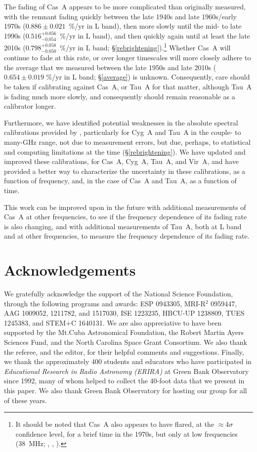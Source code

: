 \documentclass[fleqn,usenatbib]{mnras}
\begin{document}
The fading of Cas~A appears to be more complicated than originally measured, with the remnant fading quickly between the late 1940s and late 1960s/early 1970s ($0.886 \pm 0.021$~\%/yr in L band), then more slowly until the mid- to late 1990s ($0.516^{+0.056}_{-0.054}$~\%/yr in L band), and then quickly again until at least the late 2010s ($0.798^{+0.058}_{-0.050}$~\%/yr in L band; \S\ref{rebrightening}).\footnote{It should be noted that Cas~A also appears to have flared, at the $\approx$4$\sigma$ confidence level, for a brief time in the 1970s, but only at low frequencies (38~MHz; \citealt{ep75}, \citealt{r77a}, \citealt{r77b}).}  Whether Cas~A will continue to fade at this rate, or over longer timescales will more closely adhere to the average that we measured between the late 1950s and late 2010s ($0.654 \pm 0.019$ \%/yr in L band; \S\ref{average}) is unknown.  Consequently, care should be taken if calibrating against Cas~A, or Tau~A for that matter, although Tau~A is fading much more slowly, and consequently should remain reasonable as a calibrator longer.  

Furthermore, we have identified potential weaknesses in the absolute spectral calibrations provided by \citet{b77}, particularly for Cyg~A and Tau~A in the couple- to many-GHz range, not due to measurement errors, but due, perhaps, to statistical and computing limitations at the time (\S\ref{rebrightening}).  We have updated and improved these calibrations, for Cas~A, Cyg~A, Tau~A, and Vir~A, and have provided a better way to characterize the uncertainty in these calibrations, as a function of frequency, and, in the case of Cas~A and Tau~A, as a function of time.

This work can be improved upon in the future with additional measurements of Cas~A at other frequencies, to see if the frequency dependence of its fading rate is also changing, and with additional measurements of Tau~A, both at L band and at other frequencies, to measure the frequency dependence of its fading rate.

\section*{Acknowledgements}

We gratefully acknowledge the support of the National Science Foundation, through the following programs and awards:  ESP 0943305, MRI-R$^2$ 0959447, AAG 1009052, 1211782, and 1517030, ISE 1223235, HBCU-UP 1238809, TUES 1245383, and STEM$+$C 1640131.  We are also appreciative to have been supported by the Mt.\@ Cuba Astronomical Foundation, the Robert Martin Ayers Sciences Fund, and the North Carolina Space Grant Consortium.  We also thank the referee, and the editor, for their helpful comments and suggestions.  Finally, we thank the approximately 400 students and educators who have participated in \textit{Educational Research in Radio Astronomy (ERIRA)} at Green Bank Observatory since 1992, many of whom helped to collect the 40-foot data that we present in this paper.  We also thank Green Bank Observatory for hosting our group for all of these years. 
\end{document}
